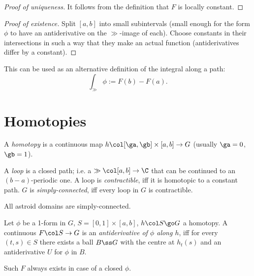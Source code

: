 \begin{proof}[Proof of uniqueness]
  It follows from the definition that $F$ is locally constant.
\end{proof}

\begin{proof}[Proof of existence]
  Split $[a, b]$ into small subintervals (small enough for the form $\phi$ to have an antiderivative on the $\gg$-image of each). Choose constants in their intersections in such a way that they make an actual function (antiderivatives differ by a constant).
\end{proof}

\begin{remark}
  This can be used as an alternative definition of the integral along a path:
  $$ \int_\gg \phi := F(b) - F(a). $$
\end{remark}


\section{Homotopies}

\begin{definition}
  A \emph{homotopy} is a continuous map $h \col [\ga, \gb] \times [a, b] \to G$ (usually $\ga = 0$, $\gb = 1$).
\end{definition}

\begin{definition}
  A \emph{loop} is a closed path; i.e. a $\gg \col [a, b] \to \C$ that can be continued to an $(b-a)$-periodic one. A loop is \emph{contractible}, iff it is homotopic to a constant path.
  $G$ is \emph{simply-connected}, iff every loop in $G$ is contractible.
\end{definition}

\begin{example}
  All astroid domains are simply-connected.  
\end{example}

\begin{definition}
  Let $\phi$ be a 1-form in $G$, $S = [0, 1] \times [a, b]$, $h \col S \go G$ a homotopy.
  A continuous $F \col S \to G$ is an \emph{antiderivative of $\phi$ along $h$}, iff for every $(t, s) \in S$ there exists a ball $B \ss G$ with the centre at $h_t(s)$ and an antiderivative $U$ for $\phi$ in $B$.
\end{definition}

\begin{theorem}
  Such $F$ always exists in case of a closed $\phi$.
\end{theorem}

